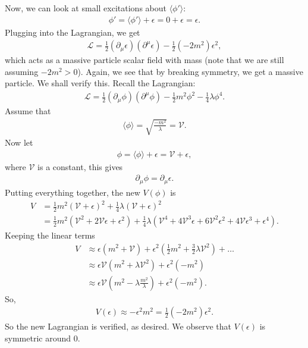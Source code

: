 \documentclass[a4paper,11pt]{article}
\numberwithin{equation}{section}
\theoremstyle{definition}
\newcommand{\p}{\partial}
\newcommand{\lag}{\mathcal{L}}
\begin{document}
Now, we can look at small excitations about $\langle \phi' \rangle$:
\begin{align}
\phi' = \langle \phi' \rangle + \epsilon = 0+\epsilon = \epsilon.
\end{align}
Plugging into the Lagrangian, we get
\begin{align}
\lag = \frac{1}{2}(\p_\mu\epsilon)(\p^\mu\epsilon) - \frac{1}{2}(-2m^2)\epsilon^2,
\end{align}
which acts as a massive particle scalar field with mass (note that we are still assuming $-2m^2 > 0$). Again, we see that by breaking symmetry, we get a massive particle. We shall verify this. Recall the Lagrangian:
\begin{align}
\lag = \frac{1}{2}(\p_\mu\phi)(\p^\mu\phi) - \frac{1}{2}m^2\phi^2 - \frac{1}{4}\lambda \phi^4.
\end{align}
Assume that
\begin{align}
\langle \phi \rangle = \sqrt{\frac{-m^2}{\lambda}} = \mathcal{V}.
\end{align}
Now let
\begin{align}
\phi = \langle \phi \rangle + \epsilon = \mathcal{V} + \epsilon,
\end{align}
where $\mathcal{V}$ is a constant, this gives
\begin{align}
\p_\mu \phi = \p_\mu\epsilon.
\end{align}
Putting everything together, the new $V(\phi)$ is
\begin{align}
V &= \frac{1}{2}m^2(\mathcal{V}+\epsilon)^2 + \frac{1}{4}\lambda(\mathcal{V}+\epsilon)^2 \\
&= \frac{1}{2}m^2(\mathcal{V}^2 + 2\mathcal{V}\epsilon + \epsilon^2) + \frac{1}{4}\lambda(\mathcal{V}^4 + 4\mathcal{V}^3\epsilon + 6\mathcal{V}^2\epsilon^2 + 4\mathcal{V}\epsilon^3 + \epsilon^4).
\end{align}
Keeping the linear terms
\begin{align}
V &\approx \epsilon(m^2 + \mathcal{V}) + \epsilon^2\left( \frac{1}{2}m^2 + \frac{3}{2}\lambda \mathcal{V}^2 \right) + \dots\\
&\approx \epsilon\mathcal{V}(m^2 + \lambda \mathcal{V}^2) + \epsilon^2(-m^2)\\
&\approx \epsilon \mathcal{V}\left( m^2 - \lambda \frac{m^2}{\lambda} \right) + \epsilon^2(-m^2).
\end{align}
So,
\begin{align}
V(\epsilon) \approx -\epsilon^2m^2 = \frac{1}{2}(-2m^2)\epsilon^2.
\end{align}
So the new Lagrangian is verified, as desired. We observe that $V(\epsilon)$ is symmetric around 0.\\
\end{document}
